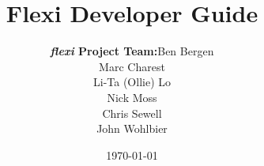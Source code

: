 
\title{\textbf{Flexi Developer Guide}}
\date{\today}
\author{\begin{tabular}{rl}
        \textbf{\emph{flexi} Project Team:} & Ben Bergen \\
                                     & Marc Charest \\
                                     & Li-Ta (Ollie) Lo \\
                                     & Nick Moss \\
                                     & Chris Sewell \\
                                     & John Wohlbier
        \end{tabular}}

